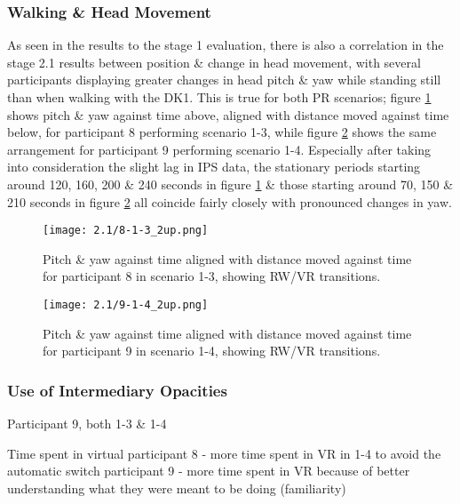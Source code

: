 \subsubsection{Walking \& Head Movement}

As seen in the results to the stage 1 evaluation, there is also a correlation in the stage 2.1 results between position \& change in head movement, with several participants displaying greater changes in head pitch \& yaw while standing still than when walking with the DK1. This is true for both PR scenarios; figure \ref{8-1-3_2up.png} shows pitch \& yaw against time above, aligned with distance moved against time below, for participant 8 performing scenario 1-3, while figure \ref{9-1-4_2up.png} shows the same arrangement for participant 9 performing scenario 1-4. Especially after taking into consideration the slight lag in IPS data, the stationary periods starting around 120, 160, 200 \& 240 seconds in figure \ref{8-1-3_2up.png} \& those starting around 70, 150 \& 210 seconds in figure \ref{9-1-4_2up.png} all coincide fairly closely with pronounced changes in yaw.

\begin{figure}[h]
	\begin{center}
	\texttt{[image: 2.1/8-1-3\_2up.png]}
	\caption{Pitch \& yaw against time aligned with distance moved against time for participant 8 in scenario 1-3, showing RW/VR transitions.}
	\label{8-1-3_2up.png}
	\end{center}
\end{figure}

\begin{figure}[h]
	\begin{center}
	\texttt{[image: 2.1/9-1-4\_2up.png]}
	\caption{Pitch \& yaw against time aligned with distance moved against time for participant 9 in scenario 1-4, showing RW/VR transitions.}
	\label{9-1-4_2up.png}
	\end{center}
\end{figure}


\subsubsection{Use of Intermediary Opacities}

Participant 9, both 1-3 \& 1-4


Time spent in virtual
	participant 8 - more time spent in VR in 1-4 to avoid the automatic switch
	participant 9 - more time spent in VR because of better understanding what they were meant to be doing (familiarity)
	
